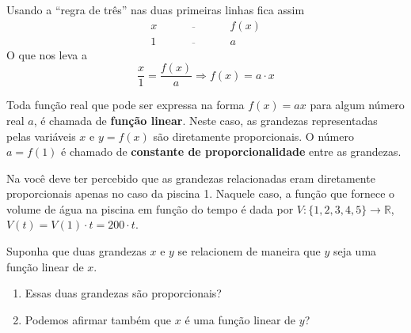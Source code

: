 \begin{observation}{}
Usando a ``regra de três'' nas duas primeiras linhas fica assim
\[\begin{array}{ccc}
x \quad &\overline{\quad \quad \quad}& \quad f(x)\\
1\quad &\overline{\quad \quad \quad}& \quad a \end{array}\]
O que nos leva a
\[\dfrac x1 = \dfrac {f(x)}a \Longrightarrow f(x) = a\cdot x\]
\end{observation}

Toda função real que pode ser expressa na forma $f(x)=ax$ para algum número real $a$, é chamada de \textbf{função linear}. Neste caso, as grandezas representadas pelas variáveis $x$ e $y=f(x)$ são diretamente proporcionais. O número $a=f(1)$ é chamado de \textbf{constante de proporcionalidade} entre as grandezas.


Na  você deve ter percebido que as grandezas relacionadas eram diretamente proporcionais apenas no caso da piscina 1. Naquele caso, a função que fornece o volume de água na piscina em função do tempo é dada por \(V:\{1,2,3,4,5\}\to \mathbb{R}\),   \(V(t)=V(1)\cdot t=200\cdot t\).

\begin{reflection}

Suponha que duas grandezas \(x\) e \(y\) se relacionem de maneira que \(y\) seja uma função linear de \(x\).
\begin{enumerate}
\item {} 
Essas duas grandezas são proporcionais?

\item {} 
Podemos afirmar também que \(x\) é uma função linear de \(y\)?

\end{enumerate}
\end{reflection}


\label{\detokenize{AF107-1:praticando}}

